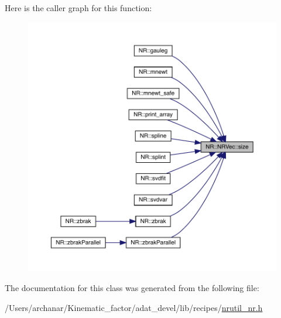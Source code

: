 Here is the caller graph for this function\+:\nopagebreak
\begin{figure}[H]
\begin{center}
\leavevmode
\includegraphics[width=350pt]{d6/d38/classNR_1_1NRVec_ab0dfb2d7ce74022fa0ce42138f4a224b_icgraph}
\end{center}
\end{figure}


The documentation for this class was generated from the following file\+:\begin{DoxyCompactItemize}
\item 
/\+Users/archanar/\+Kinematic\+\_\+factor/adat\+\_\+devel/lib/recipes/\mbox{\hyperlink{lib_2recipes_2nrutil__nr_8h}{nrutil\+\_\+nr.\+h}}\end{DoxyCompactItemize}
